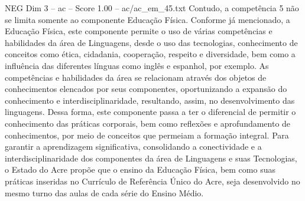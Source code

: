 \begin{textsample}{NEG Dim 3 – ac – Score 1.00 – ac/ac\_em\_45.txt}
Contudo, a competência 5 não se limita somente ao componente Educação Física.
Conforme já mencionado, a Educação Física, este componente permite o uso de várias competências e habilidades da área de Linguagens, desde o uso das tecnologias, conhecimento de conceitos como ética, cidadania, cooperação, respeito e diversidade, bem como a influência das diferentes línguas como inglês e espanhol, por exemplo.
As competências e habilidades da área se relacionam através dos objetos de conhecimentos elencados por seus componentes, oportunizando a expansão do conhecimento e interdisciplinaridade, resultando, assim, no desenvolvimento das linguagens.
Dessa forma, este componente passa a ter o diferencial de permitir o conhecimento das práticas corporais, bem como reflexões e aprofundamento de conhecimentos, por meio de conceitos que permeiam a formação integral.
Para garantir a aprendizagem significativa, consolidando a conectividade e a interdisciplinaridade dos componentes da área de Linguagens e suas Tecnologias, o Estado do Acre propõe que o ensino da Educação Física, bem como suas práticas inseridas no Currículo de Referência Único do Acre, seja desenvolvido no mesmo turno das aulas de cada série do Ensino Médio.

\end{textsample}
